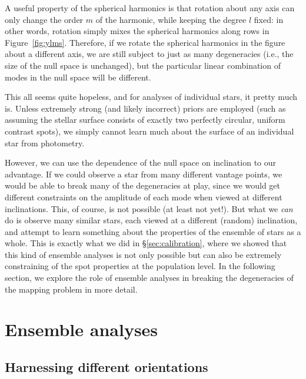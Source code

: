 \documentclass[modern]{aastex62}
\begin{document}
A useful property of
the spherical harmonics is that rotation about any axis can only change the
order $m$ of the harmonic, while keeping the degree $l$ fixed: in other
words, rotation simply mixes the spherical harmonics along rows in
Figure~\ref{fig:ylms}. Therefore, if we rotate the spherical harmonics
in the figure about a different axis, we are still subject to just as
many degeneracies (i.e., the size of the null space is unchanged),
but the particular linear combination of modes in the null space will
be different.

This all seems quite hopeless, and for analyses of individual stars,
it pretty much is. Unless extremely strong (and likely incorrect) priors are employed
(such as assuming the stellar surface consists of exactly two perfectly
circular, uniform contrast spots), we simply cannot learn much about
the surface of an individual star from photometry.

However, we can use the dependence of the null space on inclination to our
advantage. If we could observe a star from many different vantage points,
we would be able to break many of the degeneracies at play, since we
would get different constraints on the amplitude of each mode when viewed
at different inclinations. This, of course, is not possible (at least not
yet!). But what we \emph{can} do is observe many similar stars, each viewed
at a different (random) inclination, and attempt to learn something about
the properties of the ensemble of stars as a whole. This is exactly
what we did in \S\ref{sec:calibration}, where we showed that this kind
of ensemble analyses is not only possible but can also be extremely
constraining of the spot properties at the population level. In the
following section, we explore the role of ensemble analyses in breaking
the degeneracies of the mapping problem in more detail.


\section{Ensemble analyses}
\label{sec:ensemble}

\subsection{Harnessing different orientations}
\end{document}

